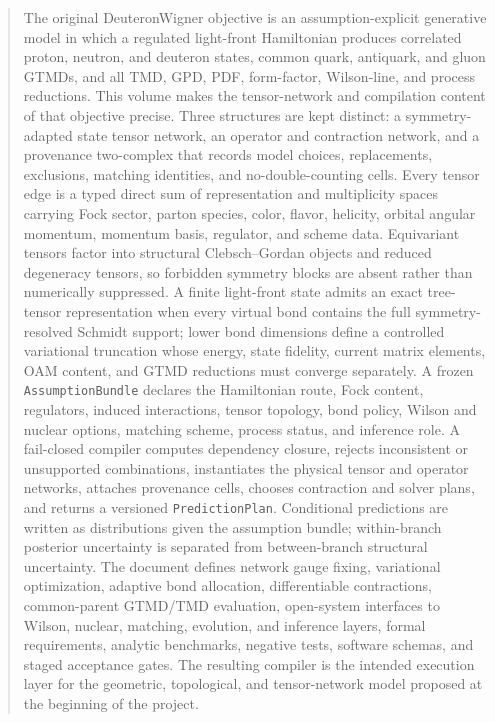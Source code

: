\documentclass[11pt]{article}
\begin{document}
\begin{abstract}
The original DeuteronWigner objective is an assumption-explicit generative
model in which a regulated light-front Hamiltonian produces correlated proton,
neutron, and deuteron states, common quark, antiquark, and gluon GTMDs, and all
TMD, GPD, PDF, form-factor, Wilson-line, and process reductions.  This volume
makes the tensor-network and compilation content of that objective precise.
Three structures are kept distinct: a symmetry-adapted state tensor network, an
operator and contraction network, and a provenance two-complex that records
model choices, replacements, exclusions, matching identities, and
no-double-counting cells.  Every tensor edge is a typed direct sum of
representation and multiplicity spaces carrying Fock sector, parton species,
color, flavor, helicity, orbital angular momentum, momentum basis, regulator,
and scheme data.  Equivariant tensors factor into structural Clebsch--Gordan
objects and reduced degeneracy tensors, so forbidden symmetry blocks are absent
rather than numerically suppressed.  A finite light-front state admits an exact
tree-tensor representation when every virtual bond contains the full symmetry-
resolved Schmidt support; lower bond dimensions define a controlled variational
truncation whose energy, state fidelity, current matrix elements, OAM content,
and GTMD reductions must converge separately.  A frozen
\texttt{AssumptionBundle} declares the Hamiltonian route, Fock content,
regulators, induced interactions, tensor topology, bond policy, Wilson and
nuclear options, matching scheme, process status, and inference role.  A
fail-closed compiler computes dependency closure, rejects inconsistent or
unsupported combinations, instantiates the physical tensor and operator
networks, attaches provenance cells, chooses contraction and solver plans, and
returns a versioned \texttt{PredictionPlan}.  Conditional predictions are
written as distributions given the assumption bundle; within-branch posterior
uncertainty is separated from between-branch structural uncertainty.  The
document defines network gauge fixing, variational optimization, adaptive bond
allocation, differentiable contractions, common-parent GTMD/TMD evaluation,
open-system interfaces to Wilson, nuclear, matching, evolution, and inference
layers, formal requirements, analytic benchmarks, negative tests, software
schemas, and staged acceptance gates.  The resulting compiler is the intended
execution layer for the geometric, topological, and tensor-network model
proposed at the beginning of the project.
\end{abstract}
\end{document}
